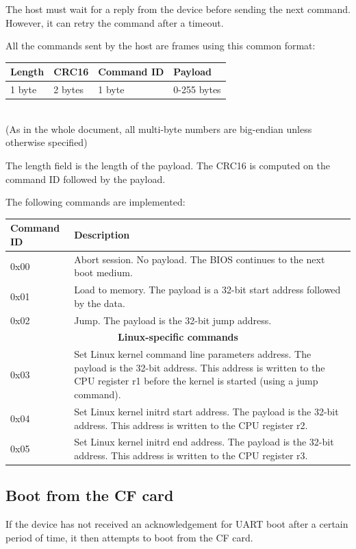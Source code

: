\documentclass[a4paper,11pt]{article}
\begin{document}
The host must wait for a reply from the device before sending the next command. However, it can retry the command after a timeout.

All the commands sent by the host are frames using this common format:\\

\begin{tabular}{|l|l|l|l|}
\hline
\textbf{Length} & \textbf{CRC16} & \textbf{Command ID} & \textbf{Payload} \\
\hline
1 byte & 2 bytes & 1 byte & 0-255 bytes \\
\hline
\end{tabular}\\

(As in the whole document, all multi-byte numbers are big-endian unless otherwise specified)

The length field is the length of the payload. The CRC16 is computed on the command ID followed by the payload.

The following commands are implemented:\\

\begin{tabularx}{\textwidth}{|l|X|}
\hline
\textbf{Command ID} & \textbf{Description} \\
\hline
0x00 & Abort session. No payload. The BIOS continues to the next boot medium. \\
\hline
0x01 & Load to memory. The payload is a 32-bit start address followed by the data. \\
\hline
0x02 & Jump. The payload is the 32-bit jump address. \\
\hline
\multicolumn{2}{|c|}{\textbf{Linux-specific commands}} \\
\hline
0x03 & Set Linux kernel command line parameters address. The payload is the 32-bit address. This address is written to the CPU register r1 before the kernel is started (using a jump command). \\
\hline
0x04 & Set Linux kernel initrd start address. The payload is the 32-bit address. This address is written to the CPU register r2. \\
\hline
0x05 & Set Linux kernel initrd end address. The payload is the 32-bit address. This address is written to the CPU register r3. \\
\hline
\end{tabularx}

\subsection{Boot from the CF card}
If the device has not received an acknowledgement for UART boot after a certain period of time, it then attempts to boot from the CF card.
\end{document}
